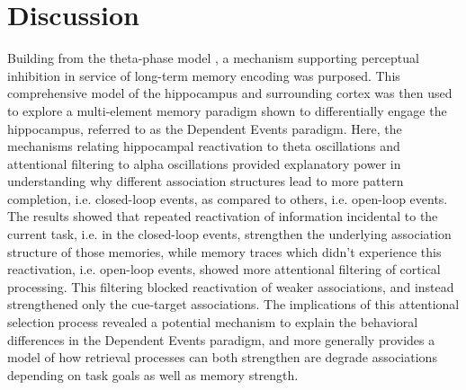 \documentclass[11pt, titlepage, twoside]{article}
\begin{document}
\section{Discussion}\label{sec:discussion}

Building from the theta-phase model \cite{KetzMorkondaOReilly13}, a mechanism supporting perceptual inhibition in service of long-term memory encoding was purposed.  This comprehensive model of the hippocampus and surrounding cortex was then used to explore a multi-element memory paradigm shown to differentially engage the hippocampus, referred to as the Dependent Events paradigm.   Here, the mechanisms relating hippocampal reactivation to theta oscillations and attentional filtering to alpha oscillations provided explanatory power in understanding why different association structures lead to more pattern completion, i.e. closed-loop events, as compared to others, i.e. open-loop events. The results showed that repeated reactivation of information incidental to the current task, i.e. in the closed-loop events, strengthen the underlying association structure of those memories, while memory traces which didn't experience this reactivation, i.e.  open-loop events, showed more attentional filtering of cortical processing.  This filtering blocked reactivation of weaker associations, and instead strengthened only the cue-target associations.  The implications of this attentional selection process revealed a potential mechanism to explain the behavioral differences in the Dependent Events paradigm, and more generally provides a model of how retrieval processes can both strengthen are degrade associations depending on task goals as well as memory strength.
\end{document}
